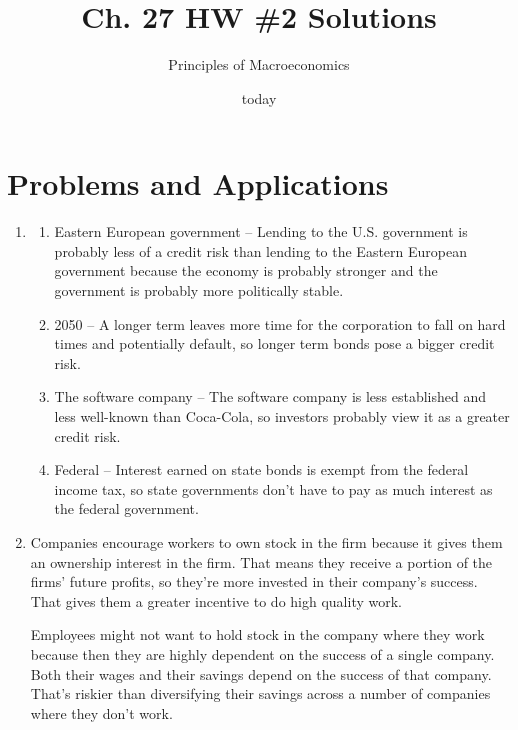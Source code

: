 \documentclass{article}
\title{Ch. 27 HW \#2 Solutions}
\author{Principles of Macroeconomics}
\date{today}
\begin{document}
\maketitle

\section*{Problems and Applications}

\begin{enumerate}

\item

	\begin{enumerate}
	
	\item Eastern European government  -- Lending to the U.S. government is probably less of a credit risk than lending to the Eastern European government because the economy is probably stronger and the government is probably more politically stable.
	
	\item 2050 -- A longer term leaves more time for the corporation to fall on hard times and potentially default, so longer term bonds pose a bigger credit risk.
	
	\item The software company -- The software company is less established and less well-known than Coca-Cola, so investors probably view it as a greater credit risk.
	
	\item Federal -- Interest earned on state bonds is exempt from the federal income tax, so state governments don't have to pay as much interest as the federal government.
	
	\end{enumerate}
	
\item Companies encourage workers to own stock in the firm because it gives them an ownership interest in the firm. That means they receive a portion of the firms’ future profits, so they’re more invested in their company’s success. That gives them a greater incentive to do high quality work. 

Employees might not want to hold stock in the company where they work because then they are highly dependent on the success of a single company. Both their wages and their savings depend on the success of that company. That’s riskier than diversifying their savings across a number of companies where they don’t work.



\end{enumerate}
\end{document}
